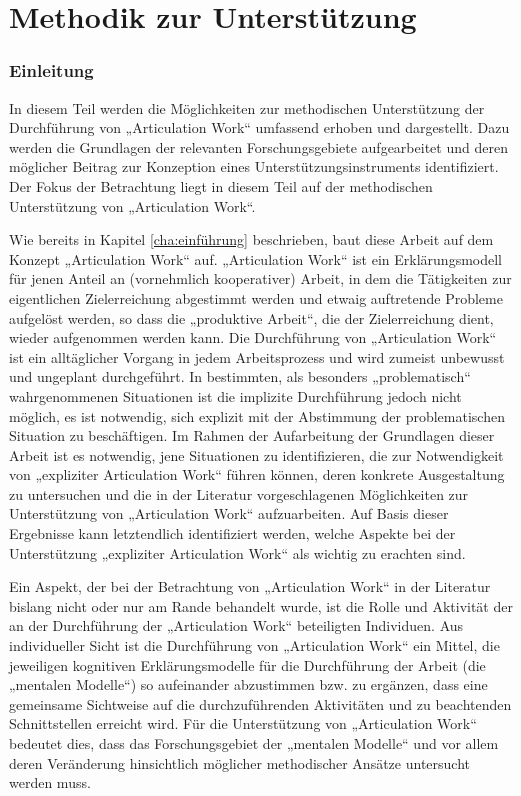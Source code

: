 \part{Methodik zur Unterstützung} %
\label{prt:grundlagen}

\section*{Einleitung} %
\label{sec:grundlagen_einleitung}


In diesem Teil werden die Möglichkeiten zur methodischen Unterstützung der Durchführung von „Articulation Work“ umfassend erhoben und dargestellt. Dazu werden die Grundlagen der relevanten Forschungsgebiete aufgearbeitet und deren möglicher Beitrag zur Konzeption eines Unterstützungsinstruments identifiziert. Der Fokus der Betrachtung liegt in diesem Teil auf der methodischen Unterstützung von „Articulation Work“.

Wie bereits in Kapitel \ref{cha:einführung} beschrieben, baut diese Arbeit auf dem Konzept „Articulation Work“ auf. „Articulation Work“ ist ein Erklärungsmodell für jenen Anteil an (vornehmlich kooperativer) Arbeit, in dem die Tätigkeiten zur eigentlichen Zielerreichung abgestimmt werden und etwaig auftretende Probleme aufgelöst werden, so dass die „produktive Arbeit“, die der Zielerreichung dient, wieder aufgenommen werden kann. Die Durchführung von „Articulation Work“ ist ein alltäglicher Vorgang in jedem Arbeitsprozess und wird zumeist unbewusst und ungeplant durchgeführt. In bestimmten, als besonders „problematisch“ wahrgenommenen Situationen ist die implizite Durchführung jedoch nicht  möglich, es ist notwendig, sich explizit mit der Abstimmung der problematischen Situation zu beschäftigen. Im Rahmen der Aufarbeitung der Grundlagen dieser Arbeit ist es notwendig, jene Situationen zu identifizieren, die zur Notwendigkeit von „expliziter Articulation Work“ führen können, deren konkrete Ausgestaltung zu untersuchen und die in der Literatur vorgeschlagenen Möglichkeiten zur Unterstützung von „Articulation Work“ aufzuarbeiten. Auf Basis dieser Ergebnisse kann letztendlich identifiziert werden, welche Aspekte bei der Unterstützung „expliziter Articulation Work“ als wichtig zu erachten sind.

Ein Aspekt, der bei der Betrachtung von „Articulation Work“ in der Literatur bislang nicht oder nur am Rande behandelt wurde, ist die Rolle und Aktivität der an der Durchführung der „Articulation Work“ beteiligten Individuen. Aus individueller Sicht ist die Durchführung von „Articulation Work“ ein Mittel, die jeweiligen kognitiven Erklärungsmodelle für die Durchführung der Arbeit (die „mentalen Modelle“) so aufeinander abzustimmen bzw. zu ergänzen, dass eine gemeinsame Sichtweise auf die durchzuführenden Aktivitäten und zu beachtenden Schnittstellen erreicht wird. Für die Unterstützung von „Articulation Work“ bedeutet dies, dass das Forschungsgebiet der „mentalen Modelle“ und vor allem deren Veränderung hinsichtlich möglicher methodischer Ansätze untersucht werden muss.

